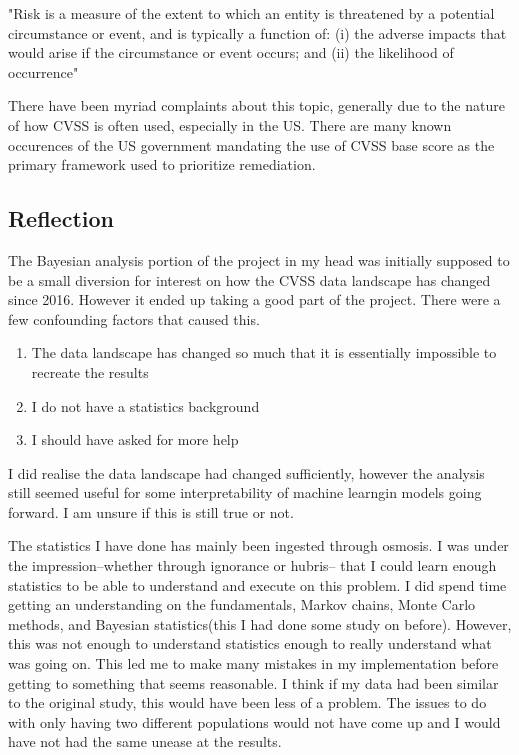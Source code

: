 \documentclass[12pt]{article}
\begin{document}
"Risk is a measure of the extent to which an entity is threatened by a potential circumstance or event, and is
typically a function of: (i) the adverse impacts that would arise if the circumstance or event occurs; and (ii) the
likelihood of occurrence"

There have been myriad complaints about this topic, generally due to the nature of how CVSS is often
used, especially in the US. There are many known occurences of the US government mandating the use
of CVSS base score as the primary framework used to prioritize remediation.

\subsection{Reflection}

The Bayesian analysis portion of the project in my head was initially supposed to be a small
diversion for interest on how the CVSS data landscape has changed since 2016. However it ended up
taking a good part of the project. There were a few confounding factors that caused this.

\begin{enumerate}
	\item The data landscape has changed so much that it is essentially impossible to recreate the
	      results
	\item I do not have a statistics background
	\item I should have asked for more help
\end{enumerate}

I did realise the data landscape had changed sufficiently, however the analysis still seemed useful
for some interpretability of machine learngin models going forward. I am unsure if this is still
true or not.

The statistics I have done has mainly been ingested through osmosis. I was under the
impression--whether through ignorance or hubris-- that I could learn enough statistics to be able to
understand and execute on this problem. I did spend time getting an understanding on the
fundamentals, Markov chains, Monte Carlo methods, and Bayesian statistics(this I had done some study
on before). However, this was not enough to understand statistics enough to really understand what
was going on. This led me to make many mistakes in my implementation before getting to something
that seems reasonable. I think if my data had been similar to the original study, this would have
been less of a problem. The issues to do with only having two different populations would not have
come up and I would have not had the same unease at the results.
\end{document}
